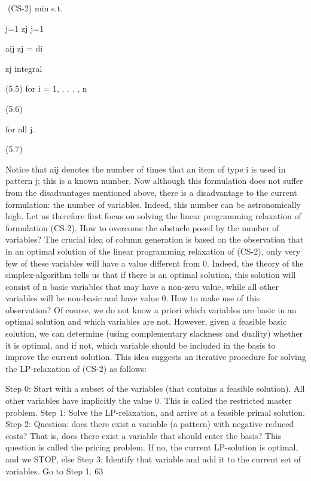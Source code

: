 (CS-2) min
s.t.

j=1 zj
j=1

aij zj = di

zj integral

(5.5)
for i = 1, . . . , n

(5.6)

for all j.

(5.7)

Notice that aij denotes the number of times that an item of type i is used in pattern j; this is a known
number. Now although this formulation does not suffer from the disadvantages mentioned above, there
is a disadvantage to the current formulation: the number of variables. Indeed, this number can be
astronomically high.
Let us therefore first focus on solving the linear programming relaxation of formulation (CS-2). How to
overcome the obstacle posed by the number of variables? The crucial idea of column generation is based
on the observation that in an optimal solution of the linear programming relaxation of (CS-2), only very
few of these variables will have a value different from 0. Indeed, the theory of the simplex-algorithm
tells us that if there is an optimal solution, this solution will consist of n basic variables that may have
a non-zero value, while all other variables will be non-basic and have value 0.
How to make use of this observation? Of course, we do not know a priori which variables are basic in an
optimal solution and which variables are not. However, given a feasible basic solution, we can determine
(using complementary slackness and duality) whether it is optimal, and if not, which variable should
be included in the basis to improve the current solution. This idea suggests an iterative procedure for
solving the LP-relaxation of (CS-2) as follows:

Step 0: Start with a subset of the variables (that contains a feasible solution). All other variables have
implicitly the value 0. This is called the restricted master problem.
Step 1: Solve the LP-relaxation, and arrive at a feasible primal solution.
Step 2: Question: does there exist a variable (a pattern) with negative reduced costs? That is, does there
exist a variable that should enter the basis? This question is called the pricing problem. If no, the
current LP-solution is optimal, and we STOP, else
Step 3: Identify that variable and add it to the current set of variables. Go to Step 1.
63

